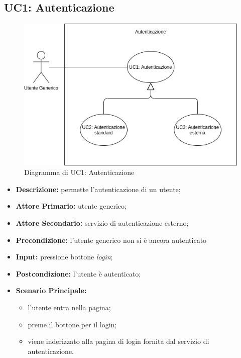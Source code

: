 \subsection{UC1: Autenticazione}
\label{sec:UC1}
\begin{figure}[!ht]
    \caption{Diagramma di UC1: Autenticazione}
    \vspace{10px}
    \includegraphics[scale=0.5]{../../../Images/AnalisiRequisiti/UC01}
    \centering
\end{figure}
\begin{itemize}
    \item \textbf{Descrizione:} permette l'autenticazione di un utente;
    \item \textbf{Attore Primario:} utente generico;
    \item \textbf{Attore Secondario:} servizio di autenticazione esterno;
    \item \textbf{Precondizione:} l'utente generico non si è ancora autenticato
    \item \textbf{Input:} pressione bottone \textit{login};
    \item \textbf{Postcondizione:} l'utente è autenticato;
    \item \textbf{Scenario Principale:}
          \begin{itemize}
              \item l'utente entra nella pagina;
              \item preme il bottone per il login;
              \item viene inderizzato alla pagina di login fornita dal servizio di autenticazione.
          \end{itemize}
\end{itemize}
\newpage
